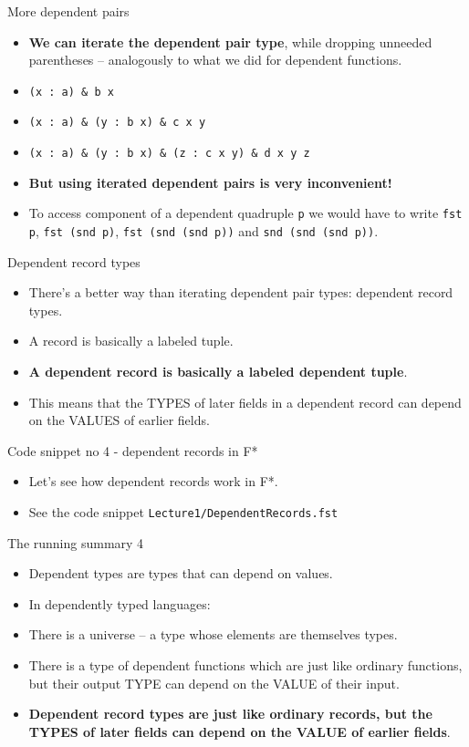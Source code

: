 \documentclass{beamer}
\newcommand{\m}[1]{\texttt{#1}}
\begin{document}
\begin{frame}{More dependent pairs}
\begin{itemize}
	\item \textbf{We can iterate the dependent pair type}, while dropping unneeded parentheses -- analogously to what we did for dependent functions.
	\item \m{(x :\ a) \& b x}
	\item \m{(x :\ a) \& (y :\ b x) \& c x y}
	\item \m{(x :\ a) \& (y :\ b x) \& (z :\ c x y) \& d x y z}
	\item \textbf{But using iterated dependent pairs is very inconvenient!}
	\item To access component of a dependent quadruple \m{p} we would have to write \m{fst p}, \m{fst (snd p)}, \m{fst (snd (snd p))} and \m{snd (snd (snd p))}.
\end{itemize}
\end{frame}

\begin{frame}{Dependent record types}
\begin{itemize}
	\item There's a better way than iterating dependent pair types: dependent record types.
	\item A record is basically a labeled tuple.
	\item \textbf{A dependent record is basically a labeled dependent tuple}.
	\item This means that the TYPES of later fields in a dependent record can depend on the VALUES of earlier fields.
\end{itemize}
\end{frame}

\begin{frame}{Code snippet no 4 - dependent records in F*}
\begin{itemize}
	\item Let's see how dependent records work in F*.
	\item See the code snippet \m{Lecture1/DependentRecords.fst}
\end{itemize}
\end{frame}

\begin{frame}{The running summary 4}
\begin{itemize}
	\item Dependent types are types that can depend on values.
	\item In dependently typed languages:
	\item There is a universe -- a type whose elements are themselves types.
	\item There is a type of dependent functions which are just like ordinary functions, but their output TYPE can depend on the VALUE of their input.
	\item \textbf{Dependent record types are just like ordinary records, but the TYPES of later fields can depend on the VALUE of earlier fields}.
\end{itemize}
\end{frame}
\end{document}
